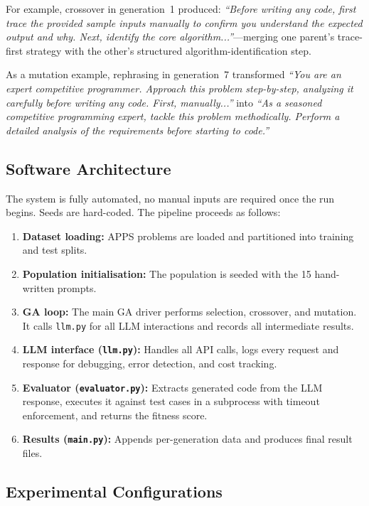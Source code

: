 \documentclass[conference]{IEEEtran}
\begin{document}
For example, crossover in generation~1 produced: \textit{``Before writing any code, first trace the provided sample inputs manually to confirm you understand the expected output and why. Next, identify the core algorithm...''}---merging one parent's trace-first strategy with the other's structured algorithm-identification step.

As a mutation example, rephrasing in generation~7 transformed \textit{``You are an expert competitive programmer. Approach this problem step-by-step, analyzing it carefully before writing any code. First, manually...''} into \textit{``As a seasoned competitive programming expert, tackle this problem methodically. Perform a detailed analysis of the requirements before starting to code.''}

\subsection{Software Architecture}

The system is fully automated, no manual inputs are required once the run begins. Seeds
are hard-coded. The pipeline proceeds as follows:

\begin{enumerate}
    \item \textbf{Dataset loading:} APPS problems are loaded and partitioned into training
    and test splits.
    \item \textbf{Population initialisation:} The population is seeded with the 15
    hand-written prompts.
    \item \textbf{GA loop:} The main GA driver performs selection, crossover, and mutation.
    It calls \texttt{llm.py} for all LLM interactions and records all intermediate results.
    \item \textbf{LLM interface (\texttt{llm.py}):} Handles all API calls, logs every
    request and response for debugging, error detection, and cost tracking.
    \item \textbf{Evaluator (\texttt{evaluator.py}):} Extracts generated code from the
    LLM response, executes it against test cases in a subprocess with timeout enforcement, and returns
    the fitness score.
    \item \textbf{Results (\texttt{main.py}):} Appends per-generation data and produces
    final result files.
\end{enumerate}

\subsection{Experimental Configurations}
\end{document}

